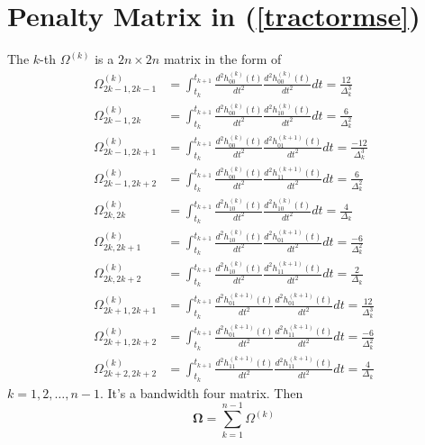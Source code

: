 


\section{Penalty Matrix in (\ref{tractormse})}\label{PenaltyTermDetails}

The $k$-th $\Omega^{(k)}$ is a $2n \times 2n$ matrix in the form of
\begin{align}
\Omega_{2k-1,2k-1}^{(k)} & =\int_{t_{k}}^{t_{k+1}} \frac{d^2 h_{00}^{(k)}(t)}{dt^2}  \frac{d^2 h_{00}^{(k)}(t)}{dt^2} dt=\frac{12}{\Delta_k^3}\\
\Omega_{2k-1,2k}^{(k)} &=\int_{t_{k}}^{t_{k+1}} \frac{d^2 h_{00}^{(k)}(t)}{dt^2}  \frac{d^2 h_{10}^{(k)}(t)}{dt^2} dt=\frac{6}{\Delta_k^2}\\
\Omega_{2k-1,2k+1}^{(k)} &=\int_{t_{k}}^{t_{k+1}} \frac{d^2 h_{00}^{(k)}(t)}{dt^2}  \frac{d^2 h_{01}^{(k+1)}(t)}{dt^2} dt=\frac{-12}{\Delta_k^3}\\
\Omega_{2k-1,2k+2}^{(k)} &=\int_{t_{k}}^{t_{k+1}} \frac{d^2 h_{00}^{(k)}(t)}{dt^2}  \frac{d^2 h_{11}^{(k+1)}(t)}{dt^2} dt=\frac{6}{\Delta_k^2}\\
\Omega_{2k,2k}^{(k)} &=\int_{t_{k}}^{t_{k+1}} \frac{d^2 h_{10}^{(k)}(t)}{dt^2}  \frac{d^2 h_{10}^{(k)}(t)}{dt^2} dt=\frac{4}{\Delta_k} \\
\Omega_{2k,2k+1}^{(k)} &=\int_{t_{k}}^{t_{k+1}} \frac{d^2 h_{10}^{(k)}(t)}{dt^2}  \frac{d^2 h_{01}^{(k+1)}(t)}{dt^2} dt=\frac{-6}{\Delta_k^2}\\
\Omega_{2k,2k+2}^{(k)} &=\int_{t_{k}}^{t_{k+1}} \frac{d^2 h_{10}^{(k)}(t)}{dt^2}  \frac{d^2 h_{11}^{(k+1)}(t)}{dt^2} dt=\frac{2}{\Delta_k}\\
\Omega_{2k+1,2k+1}^{(k)} &=\int_{t_{k}}^{t_{k+1}} \frac{d^2 h_{01}^{(k+1)}(t)}{dt^2}  \frac{d^2 h_{01}^{(k+1)}(t)}{dt^2} dt=\frac{12}{\Delta_k^3}\\
\Omega_{2k+1,2k+2}^{(k)} &=\int_{t_{k}}^{t_{k+1}} \frac{d^2 h_{01}^{(k+1)}(t)}{dt^2}  \frac{d^2 h_{11}^{(k+1)}(t)}{dt^2} dt=\frac{-6}{\Delta_k^2}\\
\Omega_{2k+2,2k+2}^{(k)} &=\int_{t_{k}}^{t_{k+1}} \frac{d^2 h_{11}^{(k+1)}(t)}{dt^2}  \frac{d^2 h_{11}^{(k+1)}(t)}{dt^2} dt=\frac{4}{\Delta_k}
\end{align}
$k=1,2,\ldots,n-1$. It's a bandwidth four matrix. Then
\begin{equation*}
\mathbf{\Omega}=\sum_{k=1}^{n-1}\Omega^{(k)}
\end{equation*}



